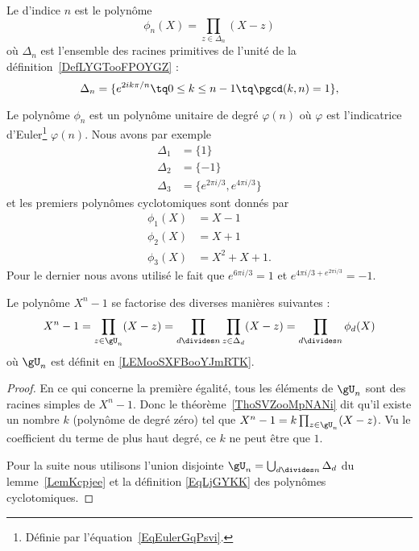 \begin{definition}  \label{DefXGHooRAXlpp}
    Le  d'indice \( n\) est le polynôme
    \begin{equation}    \label{EqLjGYKK}
        \phi_n(X)=\prod_{z\in\Delta_n}(X-z)
    \end{equation}
    où \( \Delta_n\) est l'ensemble des racines primitives de l'unité de la définition~\ref{DefLYGTooFPOYGZ} :
    \begin{equation}
        \Delta_n=\{  e^{2ik\pi/n}\tq 0\leq k\leq n-1\tq \pgcd(k,n)=1 \},
    \end{equation}
\end{definition}

Le polynôme \( \phi_n\) est un polynôme unitaire de degré \( \varphi(n)\) où \( \varphi\) est l'indicatrice d'Euler\footnote{Définie par l'équation~\ref{EqEulerGqPsvi}.} \( \varphi(n)\). Nous avons par exemple
\begin{subequations}
    \begin{align}
        \Delta_1&=\{ 1 \}\\
        \Delta_2&=\{ -1 \}\\
        \Delta_3&=\{  e^{2\pi i/3}, e^{4\pi i/3} \}
    \end{align}
\end{subequations}
et les premiers polynômes cyclotomiques sont donnés par
\begin{subequations}
    \begin{align}
        \phi_1(X)&=X-1\\
        \phi_2(X)&=X+1\\
        \phi_3(X)&=X^2+X+1.
    \end{align}
\end{subequations}
Pour le dernier nous avons utilisé le fait que \(  e^{6\pi i/3}=1\) et \(  e^{4\pi i/3+ e^{2\pi i/3}}=-1\).

\begin{lemma}   \label{LemKYGBooAwpOHD}
    Le polynôme \( X^n-1\) se factorise des diverses manières suivantes :
    \begin{equation}
        X^n-1=\prod_{z\in \gU_n}(X-z)=\prod_{d\divides n}\prod_{z\in \Delta_d}(X-z)=\prod_{d\divides n}\phi_d(X)
    \end{equation}
    où \( \gU_n\) est définit en \ref{LEMooSXFBooYJmRTK}.
\end{lemma}

\begin{proof}
    En ce qui concerne la première égalité, tous les éléments de \( \gU_n\) sont des racines simples de \( X^n-1\). Donc le théorème~\ref{ThoSVZooMpNANi} dit qu'il existe un nombre \( k\) (polynôme de degré zéro) tel que \( X^n-1=k\prod_{z\in \gU_n}(X-z)\). Vu le coefficient du terme de plus haut degré, ce \( k\) ne peut être que \( 1\).

    Pour la suite nous utilisons l'union disjointe \( \gU_n=\bigcup_{d\divides n}\Delta_d\) du lemme~\ref{LemKcpjee} et la définition \eqref{EqLjGYKK} des polynômes cyclotomiques.
\end{proof}

